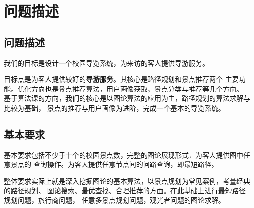 \documentclass[withoutpreface,bwprint]{cumcmthesis} %
\title{\zihao{2}{ComplierMind: LLM+编译原理助学平台}}
\begin{document}


 \maketitle

 \begin{abstract}

本项目以农大东校区为地点，使用C++为主要算法语言，开发
一个PHP\&JavaScrip架构的网页系统。
融入地图经纬度、搜索定位、两点间路径规划(DFS，Floyd, Yens)、
多景点路径规划、最优景点推荐机制。
提出了带边表，Floyd表压缩算法，
特殊目标规划模型等创新点。同时也应用蚁群算法合理解决问题。

\textbf{关键词}：中国农业大学，导览，推荐，图论，带边表，Floyd表压缩算法，蚁群算法，Floyd算法，暴力TSP，
多目标规划，php\&JavaScrip\&C++架构，leaflet调用

 \end{abstract}




\section{问题描述}

\subsection{问题描述}

我们的目标是设计一个校园导览系统，为来访的客人提供导游服务。

目标点是为客人提供较好的\textbf{导游服务}。其核心是路径规划和景点推荐两个
主要功能。优化方向也是景点推荐算法，用户画像获取，景点分类与推荐等几个方向。
基于算法课的方向，我们的核心是以图论算法的应用为主，路径规划的算法求解与比较为基础，
景点的推荐与用户画像为进阶，完成一个基本的导览系统。



\subsection{基本要求}

基本要求包括不少于十个的校园景点数，完整的图论展现形式，为客人提供图中任意景点的
查询操作。为客人提供任意节点间的问路查询，即最短路径。

整体要求实际上就是深入挖掘图论的基本算法，以景点规划为常见案例，考量经典的路径规划、
图论搜索、最优查找、合理推荐的方面。在此基础上进行最短路径规划问题，旅行商问题，
任意多景点规划问题，观光者问题的图论求解。
\end{document}
